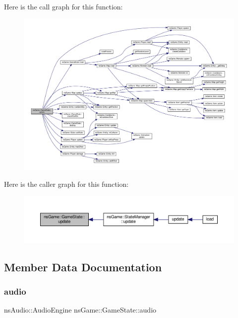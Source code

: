 Here is the call graph for this function\+:\nopagebreak
\begin{figure}[H]
\begin{center}
\leavevmode
\includegraphics[width=350pt]{classns_game_1_1_game_state_a4d3cb871a1aec541a37fe241664b738c_cgraph}
\end{center}
\end{figure}
Here is the caller graph for this function\+:\nopagebreak
\begin{figure}[H]
\begin{center}
\leavevmode
\includegraphics[width=350pt]{classns_game_1_1_game_state_a4d3cb871a1aec541a37fe241664b738c_icgraph}
\end{center}
\end{figure}


\subsection{Member Data Documentation}
\mbox{\label{classns_game_1_1_game_state_a9bd618bc831669e078759402caa0cb78}} 
\subsubsection{\texorpdfstring{audio}{audio}}
{\footnotesize\ttfamily ns\+Audio\+::\+Audio\+Engine ns\+Game\+::\+Game\+State\+::audio}




